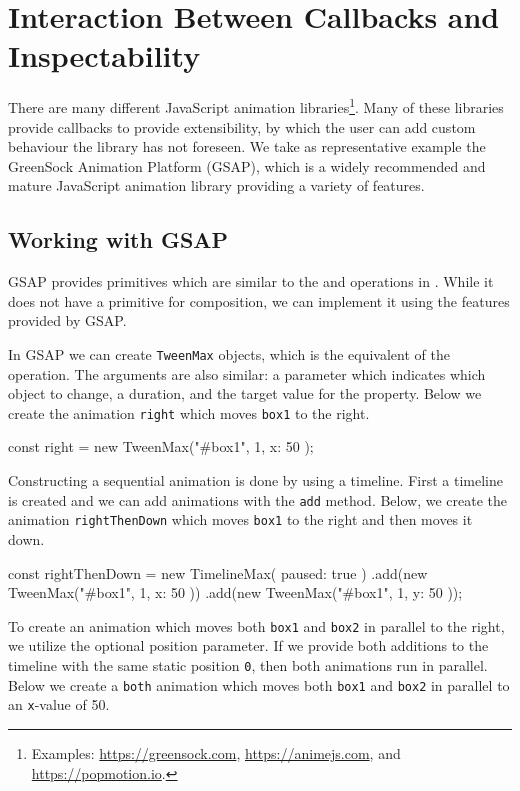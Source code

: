 \section{Interaction Between Callbacks and Inspectability}
\label{sec:evaluation}

There are many different JavaScript animation libraries\footnote{Examples: \url{https://greensock.com}, \url{https://animejs.com}, and \url{https://popmotion.io}.}. Many of these libraries provide callbacks to provide extensibility, by which the user can add custom behaviour the library has not foreseen. We take as representative example the GreenSock Animation Platform (GSAP), which is a widely recommended and mature JavaScript animation library providing a variety of features.

\subsection{Working with GSAP}

GSAP provides primitives which are similar to the  and  operations in \dsl{}. While it does not have a primitive for  composition, we can implement it using the features provided by GSAP.

In GSAP we can create \texttt{TweenMax} objects, which is the equivalent of the  operation. The arguments are also similar: a parameter which indicates which object to change, a duration, and the target value for the property. Below we create the animation \texttt{right} which moves \texttt{box1} to the right.

\begin{js}
const right = new TweenMax("#box1", 1, { x: 50 });
\end{js}

Constructing a sequential animation is done by using a timeline. First a timeline is created and we can add animations with the \texttt{add} method. Below, we create the animation \texttt{rightThenDown} which moves \texttt{box1} to the right and then moves it down.

\begin{js}
const rightThenDown = new TimelineMax({ paused: true })
  .add(new TweenMax("#box1", 1, { x: 50 }))
  .add(new TweenMax("#box1", 1, { y: 50 }));
\end{js}

To create an animation which moves both \texttt{box1} and \texttt{box2} in parallel to the right, we utilize the optional position parameter. If we provide both additions to the timeline with the same static position \texttt{0}, then both animations run in parallel. Below we create a \texttt{both} animation which moves both \texttt{box1} and \texttt{box2} in parallel to an \texttt{x}-value of 50.

